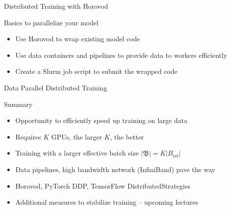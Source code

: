 \begin{frame}{Distributed Training with Horovod}
\protect\hypertarget{distributed-training-with-horovod-6}{}

\begin{block}{Basics to parallelize your model}

\begin{itemize}
\tightlist
\item
  Use Horovod to wrap existing model code
\item
  Use data containers and pipelines to provide data to workers
  efficiently
\item
  Create a Slurm job script to submit the wrapped code
\end{itemize}

\end{block}


\end{frame}

\begin{frame}{Data Parallel Distributed Training}
\protect\hypertarget{data-parallel-distributed-training}{}

\begin{block}{Summary}

\begin{itemize}
\tightlist
\item
  Opportunity to efficiently speed up training on large data
\item
  Requires \(K\) GPUs, the larger \(K\), the better
\item
  Training with a larger effective batch size
  \(\vert \mathfrak{B} \vert = K \vert B_{\text{ref}} \vert\)
\item
  Data pipelines, high bandwidth network (InfiniBand) pave the way
\item
  Horovod, PyTorch DDP, TensorFlow DistributedStrategies
\item
  Additional measures to stabilize training -- upcoming lectures
\end{itemize}

\end{block}


\end{frame}
